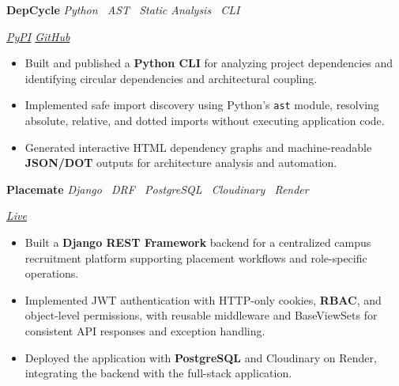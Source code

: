 \documentclass[10pt,a4paper]{article}
\newcommand{\projectentry}[3]{%
    \noindent
    \begin{minipage}[t]{0.62\linewidth}
        \raggedright
        \textbf{#1}
        \hspace{0.7em}
        \textit{\color{textgray}#2}
    \end{minipage}%
    \hfill
    \begin{minipage}[t]{0.34\linewidth}
        \raggedleft
        \itshape\color{textgray}#3
    \end{minipage}%
    \par
}
\begin{document}
\vspace{3pt}

\projectentry
    {DepCycle}
    {Python \textperiodcentered\ AST \textperiodcentered\ Static Analysis \textperiodcentered\ CLI}
    {\href{https://pypi.org/project/depcycle/}{PyPI}
    \quad
    \href{https://github.com/Matricess/depcycle}{GitHub}}

\vspace{2pt}

\begin{itemize}
    \item Built and published a \textbf{Python CLI} for analyzing project dependencies and identifying circular dependencies and architectural coupling.

    \item Implemented safe import discovery using Python's \texttt{ast} module, resolving absolute, relative, and dotted imports without executing application code.

    \item Generated interactive HTML dependency graphs and machine-readable \textbf{JSON/DOT} outputs for architecture analysis and automation.
\end{itemize}

\vspace{3pt}

\projectentry
    {Placemate}
    {Django \textperiodcentered\ DRF \textperiodcentered\ PostgreSQL \textperiodcentered\ Cloudinary \textperiodcentered\ Render}
    {\href{https://placemate-coral.vercel.app/}{Live}}

\vspace{2pt}

\begin{itemize}
    \item Built a \textbf{Django REST Framework} backend for a centralized campus recruitment platform supporting placement workflows and role-specific operations.

    \item Implemented JWT authentication with HTTP-only cookies, \textbf{RBAC}, and object-level permissions, with reusable middleware and BaseViewSets for consistent API responses and exception handling.

    \item Deployed the application with \textbf{PostgreSQL} and Cloudinary on Render, integrating the backend with the full-stack application.
\end{itemize}
\end{document}
